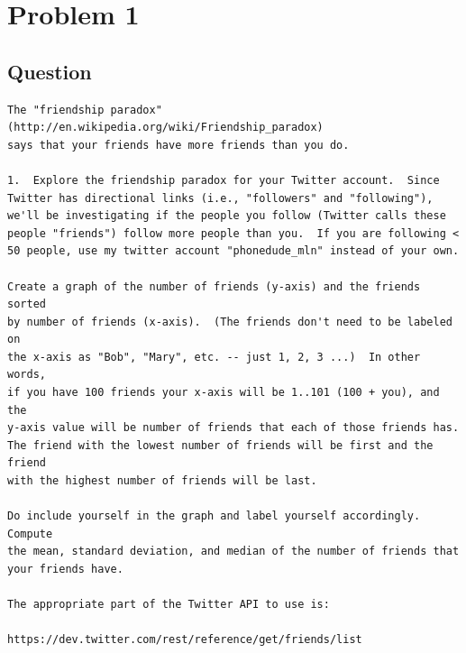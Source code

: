 \section{Problem 1}
\label{part1}
\subsection*{Question}
\begingroup
\begin{verbatim}
The "friendship paradox" (http://en.wikipedia.org/wiki/Friendship_paradox)
says that your friends have more friends than you do.  

1.  Explore the friendship paradox for your Twitter account.  Since
Twitter has directional links (i.e., "followers" and "following"),
we'll be investigating if the people you follow (Twitter calls these
people "friends") follow more people than you.  If you are following <
50 people, use my twitter account "phonedude_mln" instead of your own.

Create a graph of the number of friends (y-axis) and the friends sorted
by number of friends (x-axis).  (The friends don't need to be labeled on
the x-axis as "Bob", "Mary", etc. -- just 1, 2, 3 ...)  In other words,
if you have 100 friends your x-axis will be 1..101 (100 + you), and the
y-axis value will be number of friends that each of those friends has.
The friend with the lowest number of friends will be first and the friend
with the highest number of friends will be last.

Do include yourself in the graph and label yourself accordingly.  Compute
the mean, standard deviation, and median of the number of friends that
your friends have.

The appropriate part of the Twitter API to use is:

https://dev.twitter.com/rest/reference/get/friends/list

\end{verbatim}

